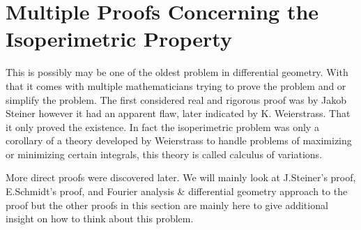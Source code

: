 \documentclass[a4paper]{book}
\numberwithin{theorem}{section}%
\begin{document}

\chapter{Multiple Proofs Concerning the Isoperimetric Property}
This is possibly may be one of the oldest problem in differential geometry. With that it comes with multiple mathematicians trying to prove the problem and or simplify the problem. The first considered real and rigorous proof was by Jakob Steiner however it had an apparent flaw, later indicated by K. Weierstrass. That it only proved the existence. In fact the isoperimetric problem was only a corollary of a theory developed by Weierstrass to handle problems of maximizing or minimizing certain integrals, this theory is called calculus of variations. 

More direct proofs were discovered later. We will mainly look at J.Steiner's proof, E.Schmidt's proof, and Fourier analysis {\&} differential geometry approach to the proof but the other proofs in this section are mainly here to give additional insight on how to think about this problem. 
\end{document}
